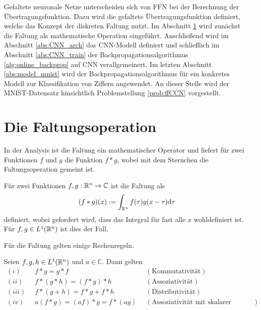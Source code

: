 Gefaltete neuronale Netze unterscheiden sich von FFN bei der Berechnung der Übertragungsfunktion. Dazu wird die gefaltete Übertragungsfunktion definiert, welche das Konzept der diskreten Faltung nutzt. Im Abschnitt \ref{abs:conv_theorie} wird zunächst die Faltung als mathematische Operation eingeführt. 
Anschließend wird im Abschnitt \ref{abs:CNN_arch} das CNN-Modell definiert und schließlich im Abschnitt \ref{abs:CNN_train} der Backpropagationsalgorithmus \ref{alg:online_backprop} auf CNN verallgemeinert. Im letzten Abschnitt \ref{abs:model_mnist} wird der Backpropagationsalgorithmus für ein konkretes Modell zur Klassifikation von Ziffern angewendet. An dieser Stelle wird der MNIST-Datensatz hinsichtlich Problemstellung \ref{prob:ffCCN} vorgestellt.

\section{Die Faltungsoperation}
\label{abs:conv_theorie}
In der Analysis ist die Faltung ein mathematischer Operator und liefert für zwei Funktionen $f$ und $g$ die Funktion $ f \ast g$, wobei mit dem Sternchen die Faltungsoperation gemeint ist.

\begin{defi}[Faltung]\label{allg_faltung}
    Für zwei Funktionen $f,g: \mathbb{R}^{n} \rightarrow \mathbb{C}$ ist die Faltung als
    \begin{equation*}
        (f \ast g) (x) := \int_{\mathbb{R}^{n}} f(\tau) g(x-\tau) \mathrm{d} \tau
    \end{equation*}
    definiert, wobei gefordert wird, dass das Integral für fast alle $x$ wohldefiniert ist. Für $f,g \in L^1(\mathbb{R}^n)$ ist dies der Fall.
   \end{defi}

Für die Faltung gelten einige Rechenregeln.

\begin{lem}
    \label{lem:convrules}
    Seien $f,g,h \in L^1(\mathbb{R}^n)$ und $a \in \mathbb{C}$. Dann gelten
    \begin{align*}
         (i) \; \; &f \ast g = g \ast f \; \; &( \text{Kommutativität}) \\
         (ii) \; \; &f \ast (g \ast h) = (f \ast g) \ast h  \; \;& (\text{Assoziativität}) \\
         (iii) \; \; &f \ast (g+h) = f \ast g + f\ast h \; \; &(\text{Distributivität}) \\ 
         (iv) \; \; &a(f \ast g) = (af) \ast g = f \ast (ag) \; \; &(\text{Assoziativität mit skalarer Multiplikation}) 
    \end{align*}
\end{lem}

